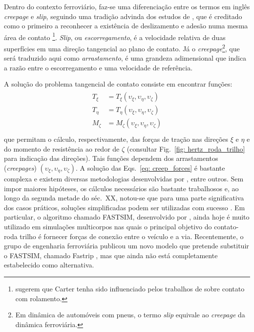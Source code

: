 Dentro do contexto ferroviário, faz-se uma diferenciação entre os termos em inglês \textit{creepage} e \textit{slip}, seguindo uma tradição
advinda dos estudos de , que é creditado como o primeiro a reconhecer a existência
de deslizamento e adesão numa mesma área de contato \footnote{ sugerem que Carter
tenha sido influenciado pelos trabalhos de  sobre contato com rolamento.}. \textit{Slip},
ou \textit{escorregamento}, é a velocidade relativa de duas superfícies em uma direção tangencial ao plano de contato.
Já o \textit{creepage}\footnote{Em dinâmica de automóveis com pneus, o termo \textit{slip}
equivale ao \textit{creepage} da dinâmica ferroviária.}, que será traduzido aqui como \textit{arrastamento}, é uma grandeza adimensional 
que indica a razão 
entre o escorregamento e uma velocidade de referência.

A solução do problema tangencial de contato consiste em encontrar funções:
\begin{align}
    \begin{split}
        T_\xi &= T_\xi(\upsilon_\xi,\upsilon_\eta,\upsilon_\zeta) \\
        T_\eta &= T_\eta(\upsilon_\xi,\upsilon_\eta,\upsilon_\zeta) \\
        M_\zeta &= M_\zeta(\upsilon_\xi,\upsilon_\eta,\upsilon_\zeta) \\
    \end{split}\label{eq: creep_forces}
\end{align}
que permitam o cálculo, respectivamente, das forças de tração nas direções $\xi$ e $\eta$ e do momento de resistência
ao redor de $\zeta$ (consultar Fig.~\ref{fig: hertz_roda_trilho} para indicação das direções). Tais funções dependem 
dos arrastamentos (\textit{creepages}) $\left(\upsilon_\xi,\upsilon_\eta,\upsilon_\zeta\right)$. A solução das
Eqs.~\eqref{eq: creep_forces} é bastante complexa e existem diversas metodologias desenvolvidas por 
\citeauthor{johnson_contact_1985,kalker_fast_1982,polach_creep_2005,vollebregt_numerical_2014}, entre outros. Sem impor maiores
hipóteses, os cálculos necessários são bastante trabalhosos e, ao longo da segunda metade do séc.~XX,
notou-se que para uma parte significativa dos casos práticos, soluções simplificadas podem ser utilizadas com 
sucesso \cite{zaazaa_review_2009}. Em particular, o algoritmo chamado FASTSIM, desenvolvido por ,
ainda hoje é muito utilizado em simulações multicorpos nas quais o principal objetivo do contato-roda trilho
é fornecer forças de conexão entre o veículo e a via. Recentemente, o grupo de engenharia ferroviária publicou um
novo modelo que pretende substituir o FASTSIM, chamado Fastrip \cite{sh_sichani_alternative_2016}, mas que ainda
não está completamente estabelecido como alternativa.

